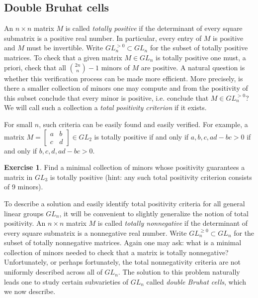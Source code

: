 \documentclass{amsart}
\theoremstyle{definition}
\newtheorem{example}[theorem]{Example}
\newtheorem{exercise}[theorem]{Exercise}
\theoremstyle{remark}
\numberwithin{equation}{section}
\begin{document}
	\subsection{Double Bruhat cells} \label{sub:total positivity}
    An $n\times n$ matrix $M$ is called \emph{totally positive} if the determinant of every square submatrix is a positive real number.  In particular, every entry of $M$ is positive and $M$ must be invertible.  Write $GL_n^{>0}\subset GL_n$ for the subset of totally positive matrices.  To check that a given matrix $M\in GL_n$ is totally positive one must, a priori, check that all ${2n\choose n}-1$ minors of $M$ are positive.  A natural question is whether this verification process can be made more efficient.  More precisely, is there a smaller collection of minors one may compute and from the positivity of this subset conclude that every minor is positive, i.e. conclude that $M\in GL_n^{>0}$?  We will call such a collection a \emph{total positivity criterion} if it exists.  

    For small $n$, such criteria can be easily found and easily verified.  For example, a matrix $M=\left[\begin{array}{cc} a & b\\ c & d\end{array}\right]\in GL_2$ is totally positive if and only if $a,b,c,ad-bc>0$ if and only if $b,c,d,ad-bc>0$.
    \begin{exercise}\label{exer:gl3 positivity}
      Find a minimal collection of minors whose positivity guarantees a matrix in $GL_3$ is totally positive (hint: any such total positivity criterion consists of 9 minors).
    \end{exercise}

    To describe a solution and easily identify total positivity criteria for all general linear groups $GL_n$, it will be convenient to slightly generalize the notion of total positivity.  An $n\times n$ matrix $M$ is called \emph{totally nonnegative} if the determinant of every square submatrix is a nonnegative real number.  Write $GL_n^{\ge0}\subset GL_n$ for the subset of totally nonnegative matrices.  Again one may ask: what is a minimal collection of minors needed to check that a matrix is totally nonnegative?  Unfortunately, or perhaps fortunately, the total nonnegativity criteria are not uniformly described across all of $GL_n$.  The solution to this problem naturally leads one to study certain subvarieties of $GL_n$ called \emph{double Bruhat cells}, which we now describe.
\end{document}
